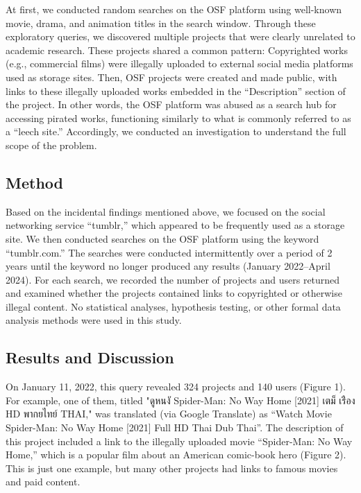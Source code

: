 \documentclass[authordate, meta]{jote-new-article}
\begin{document}
	At first, we conducted random searches on the OSF platform using well-known movie, drama, and animation titles in the search window. Through these exploratory queries, we discovered multiple projects that were clearly unrelated to academic research. These projects shared a common pattern: Copyrighted works (e.g., commercial films) were illegally uploaded to external social media platforms used as storage sites. Then, OSF projects were created and made public, with links to these illegally uploaded works embedded in the “Description” section of the project. In other words, the OSF platform was abused as a search hub for accessing pirated works, functioning similarly to what is commonly referred to as a “leech site.” Accordingly, we conducted an investigation to understand the full scope of the problem.







	\subsection{Method }



	Based on the incidental findings mentioned above, we focused on the social networking service “tumblr,” which appeared to be frequently used as a storage site. We then conducted searches on the OSF platform using the keyword “tumblr.com.” The searches were conducted intermittently over a period of 2 years until the keyword no longer produced any results (January 2022--April 2024). For each search, we recorded the number of projects and users returned and examined whether the projects contained links to copyrighted or otherwise illegal content. No statistical analyses, hypothesis testing, or other formal data analysis methods were used in this study.







	\subsection{Results and Discussion }



	On January 11, 2022, this query revealed 324 projects and 140 users (Figure 1). For example, one of them, titled {\thaifont "ดูหนงั \triangleright Spider-Man: No Way Home [2021] เตม็ เร่ือง HD พากยไทย์ THAI,"} was translated (via Google Translate) as {\thaifont“Watch Movie \triangleright Spider-Man: No Way Home [2021] Full HD Thai Dub Thai”}. The description of this project included a link to the illegally uploaded movie “Spider-Man: No Way Home,” which is a popular film about an American comic-book hero (Figure 2). This is just one example, but many other projects had links to famous movies and paid content.
\end{document}
